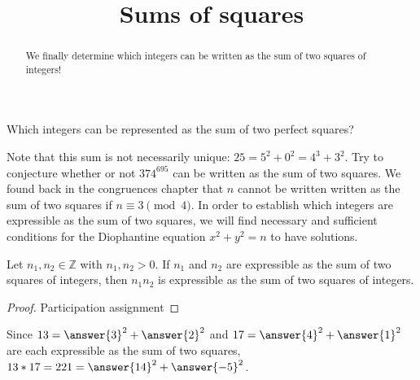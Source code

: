 \documentclass{ximera}
\title{Sums of squares}
\begin{document}
  
\begin{abstract}  
We finally determine which integers can be written as the sum of two squares of integers!
\end{abstract}
\maketitle  

Which integers can be represented as the sum of two perfect squares? 

\begin{selectAll}
 \end{selectAll}
 \begin{selectAll}
\end{selectAll}

Note that this sum is not necessarily unique: $25=5^2+0^2=4^3+3^2$. Try to conjecture whether or not $374^{695}$ can be written as the sum of two squares. We found back in the congruences chapter that $n$ cannot be written written as the sum of two squares if $n\equiv 3 \pmod 4$. In order to establish which integers are expressible as the sum of two squares, we will find necessary and sufficient conditions for the Diophantine equation $x^2+y^2=n$ to have solutions.

\begin{theorem}
 Let $n_1,n_2\in\mathbb{Z}$ with $n_1,n_2>0$. If $n_1$ and $n_2$ are expressible as the sum of two squares of integers, then $n_1n_2$ is expressible as the sum of two squares of integers.
\end{theorem}
\begin{proof}
Participation assignment
\end{proof}

\begin{example}
 Since $13=\answer{3}^2+\answer{2}^2$ and $17=\answer{4}^2+\answer{1}^2$ are each expressible as the sum of two squares, $13*17=221=\answer{14}^2+\answer{-5}^2$.
\end{example}
\end{document}
